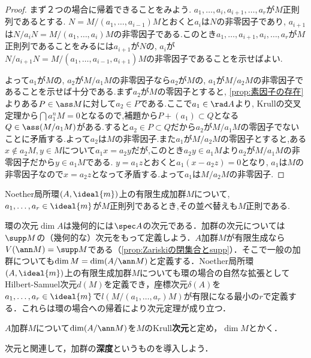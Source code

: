 \begin{proof}
	まず２つの場合に帰着できることをみよう. $a_1,\dots,a_i,a_{i+1},\dots,a_r$が$M$正則列であるとする. $N=M/(a_1,\dots,a_{i-1})M$とおくと$a_i$は$N$の非零因子であり, $a_{i+1}$は$N/a_iN=M/(a_1,\dots,a_i)M$の非零因子である.このとき$a_1,\dots,a_{i+1},a_i,\dots,a_r$が$M$正則列であることをみるには$a_{i+1}$が$N$の, $a_i$が$N/a_{i+1}N=M/(a_1,\dots,a_{i-1},a_{i+1})M$の非零因子であることを示せばよい.
	
	よって$a_1$が$M$の, $a_2$が$M/a_1M$の非零因子なら$a_2$が$M$の, $a_1$が$M/a_2M$の非零因子であることを示せば十分である.まず$a_2$が$M$の零因子とすると, \ref{prop:素因子の存在}よりある$P\in\ass M$に対して$a_2\in P$である.ここで$a_1\in\rad A$より, Krullの交叉定理から$\bigcap a_1^nM=0$となるので,補題から$P+(a_1)\subset Q$となる$Q\in\ass (M/a_1M)$がある.すると$a_2\in P\subset Q$だから$a_2$が$M/a_1M$の零因子でないことに矛盾する.よって$a_2$は$M$の非零因子.また$a_1$が$M/a_2M$の零因子とすると,ある$x\not\in a_2M,y\in M$について$a_1x=a_2y$だが,このとき$a_2y\in a_1M$より$a_2$が$M/a_1M$の非零因子だから$y\in a_1M$である. $y=a_1z$とおくと$a_1(x-a_2z)=0$となり, $a_1$は$M$の非零因子なので$x=a_2z$となって矛盾する.よって$a_1$は$M/a_2M$の非零因子.
\end{proof}

\begin{cor}
	Noether局所環$(A,\ideal{m})$上の有限生成加群$M$について, $a_1,\dots,a_r\in\ideal{m}$が$M$正則列であるとき,その並べ替えも$M$正則である.
\end{cor}

環の次元$\dim A$は幾何的には$\spec A$の次元である．加群の次元については$\supp M$の（幾何的な）次元をもって定義しよう．$A$加群$M$が有限生成なら$V(\ann M)=\supp M$である（\ref{prop:Zariskiの閉集合とsupp}）．そこで一般の加群についても$\dim M=\dim (A/\ann M)$と定義する．Noether局所環$(A,\ideal{m})$上の有限生成加群$M$についても環の場合の自然な拡張としてHilbert-Samuel次元$d(M)$を定義でき，座標次元$\delta(A)$を$a_1,\dots,a_r\in\ideal{m}$で$l(M/(a_1,\dots,a_r)M)$が有限になる最小の$r$で定義する．これらは環の場合への帰着により次元定理が成り立つ．

\begin{defi}[加群のKrull次元]
	$A$加群$M$について$\dim (A/\ann M)$を$M$のKrull\textbf{次元}と定め，$\dim M$とかく．
\end{defi}

次元と関連して，加群の\textbf{深度}というものを導入しよう．
